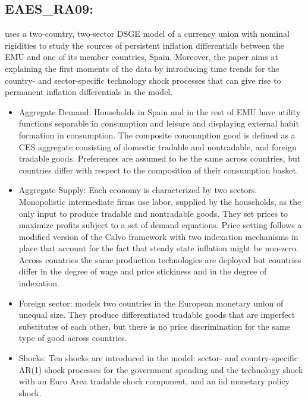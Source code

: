 \documentclass[11pt,a4paper]{article}
\begin{document}
	
	
	\subsection{EAES\_RA09: \cite{Rabanal2009}}
	\label{EAESRA09}
	\cite{Rabanal2009} uses a two-country, two-sector DSGE model of a currency union with nominal rigidities to study the sources of persistent inflation differentials between the EMU and one of its member countries, Spain. Moreover, the paper aims at explaining the first moments of the data by introducing time trends for the country- and sector-specific technology shock processes that can give rise to permanent inflation differentials in the model.
	
	\begin{itemize}
		\item Aggregate Demand: Households in Spain and in the rest of EMU have utility functions separable in consumption and leisure and displaying external habit formation in consumption.  The composite consumption good is defined as a CES aggregate consisting of domestic tradable and nontradable, and foreign tradable goods. Preferences are assumed to be the same across countries, but countries differ with respect to the composition of their consumption basket.
		
		\item Aggregate Supply: Each economy is characterized by two sectors. Monopolistic intermediate firms use labor, supplied by the households, as the only input to produce tradable and nontradable goods. They set prices to maximize profits subject to a set of demand equations. Price setting follows a modified version of the Calvo framework with two indexation mechanisms in place that account for the fact that steady state inflation might be non-zero. Across countries the same production technologies are deployed but countries differ in the degree of wage and price stickiness and in the degree of indexation.
		
		\item Foreign sector: \cite{Rabanal2009} models two countries in the European monetary union of unequal size. They produce differentiated tradable goods that are imperfect substitutes of each other, but there is no price discrimination for the same type of good across countries.
		
		\item Shocks: Ten shocks are introduced in the model: sector- and country-specific AR(1) shock processes for the government spending and the technology shock with an Euro Area tradable shock component, and an iid monetary policy shock.
		

\end{itemize}
\end{document}
